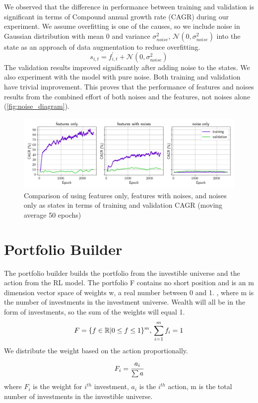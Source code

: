We observed that the difference in performance between training and validation is significant in terms of Compound annual growth rate (CAGR) during our experiment. We assume overfitting is one of the causes, so we include noise in Gaussian distribution with mean 0 and variance \(\sigma_{noise}^2\), \(\mathcal{N}(0,\sigma_{noise}^2)\) into the state as an approach of data augmentation to reduce overfitting.
\[
    s_{i,t} = f^{'}_{i,t} + \mathcal{N}(0,\sigma_{noise}^2)
\]
The validation results improved significantly after adding noise to the states. We also experiment with the model with pure noise. Both training and validation have trivial improvement. This proves that the performance of features and noises results from the combined effort of both noises and the features, not noises alone (\autoref{fig:noise_diagram}). 
\begin{figure}[htb]
  \includegraphics[width=15cm]{images/compare_noise.png}
  \caption [Comparison of features/noise] {Comparison of using features only, features with noises, and noises only as states in terms of training and validation CAGR (moving average 50 epochs)}
  \label{fig:noise_diagram}
\end{figure}

\section {Portfolio Builder}
The portfolio builder builds the portfolio from the investible universe and the action from the RL model.
The portfolio F contains no short position and is an m dimension vector space of weights w, a real number between 0 and 1. , where m is the number of investments in the investment universe. Wealth will all be in the form of investments, so the sum of the weights will equal 1.
\[
    F = \{ {f \in \mathbb{R} | 0 \leq f \leq 1 } \} ^m,
    \\
    \sum_{i=1}^m {f_i} =1
\]
We distribute the weight based on the action proportionally.
\[
    F_i = \cfrac{a_i}{\sum a} 
\]
where \(F_i\) is the weight for \(i^{th}\) investment, \(a_i\) is the  \(i^{th}\) action, m is the total number of investments in the investible universe. 



